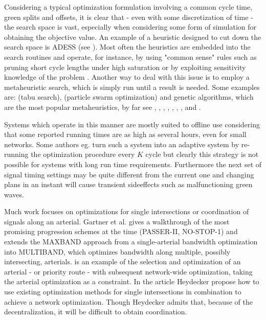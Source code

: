 Considering a typical optimization formulation involving a common
cycle time, green splits and offsets, it is clear that - even with some
discretization of time - the search space is vast, especially when
considering some form of simulation for obtaining the objective
value. An example of a heuristic designed to cut down the search
space is ADESS (see \cite{26}). Most often the heuristics are embedded
into the search routines and operate, for instance, by using "common
sense" rules such as pruning short cycle lengths under high
saturation or by exploiting sensitivity knowledge of the problem
\cite{40}.  Another way to deal with this issue is to employ a
metaheuristic search, which is simply run until a result is
needed. Some examples are: \cite{1} (tabu search), \cite{42} (particle
swarm optimization) and genetic algorithms, which are the most popular
metaheuristics, by far see \cite{13}, \cite{33}, \cite{43}, \cite{7},
\cite{41}, \cite{31}, \cite{27}, \cite{2} and \cite{26}.

Systems which operate in this manner are mostly suited to offline use
considering that some reported running times are as high as several
hours, even for small networks.  Some authors eg. \cite{16} turn
such a system into an adaptive system by re-running the optimization
procedure every $K$ cycle but clearly this strategy is not possible
for systems with long run time requirements. Furthermore the next set
of signal timing settings may be quite different from the current one
and changing plans in an instant will cause transient sideeffects such
as malfunctioning green waves.

Much work focuses on optimizations for single intersections or
coordination of signals along an arterial. Gartner et al. \cite{9}
gives a walkthrough of the most promising progression schemes at the
time (PASSER-II, NO-STOP-1) and extends the MAXBAND approach from a
single-arterial bandwidth optimization into MULTIBAND, which optimizes
bandwidth along multiple, possibly intersecting, arterials. \cite{6}
is an example of the selection and optimization of an arterial - or
priority route - with subsequent network-wide optimization, taking the
arterial optimization as a constraint.  In the article \cite{24}
Heydecker propose how to use existing optimization methods for single
intersections in combination to achieve a network optimization. Though
Heydecker admits that, because of the decentralization, it will be
difficult to obtain coordination.
